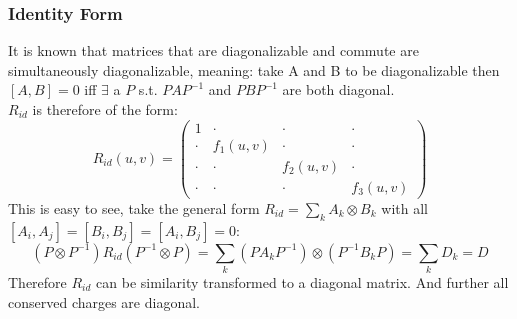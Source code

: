 \documentclass{article}
\begin{document}
\subsubsection{Identity Form}
It is known that matrices that are diagonalizable and commute are simultaneously  diagonalizable, meaning: take A and B to be diagonalizable then $[A,B]=0$ iff $\exists$ a $P$ s.t. $PAP^{-1}$ and $PBP^{-1}$ are both diagonal.\\
$R_{id}$ is therefore of the form:
\begin{equation}
    R_{id}(u,v) = \begin{pmatrix}
        1&\cdot&\cdot&\cdot\\
        \cdot&f_1(u,v)&\cdot&\cdot\\
        \cdot&\cdot&f_2(u,v)&\cdot\\
        \cdot&\cdot&\cdot&f_3(u,v)
    \end{pmatrix}
\end{equation}
This is easy to see, take the general form $R_{id}=\sum_k A_k \otimes B_k$ with all $[A_i,A_j]=[B_i,B_j]=[A_i,B_j]=0$:
\begin{equation*}
  ( P\otimes P^{-1} ) R_{id} (P^{-1}\otimes P)=\sum_k (P A_k P^{-1} ) \otimes ( P^{-1} B_k P )=\sum_k D_k =D
\end{equation*}
Therefore $R_{id}$ can be similarity transformed to a diagonal matrix.
And further all conserved charges are diagonal.


\fi
\end{document}
